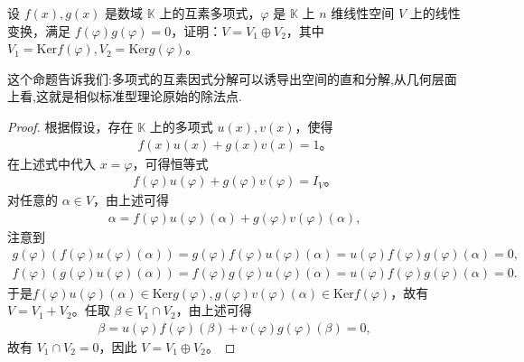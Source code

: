 \documentclass[lang=cn,newtx,10pt,scheme=chinese]{elegantbook}
\begin{document}
\begin{proposition}
设 $f(x), g(x)$ 是数域 $\mathbb{K}$ 上的互素多项式，$\varphi$ 是 $\mathbb{K}$ 上 $n$ 维线性空间 $V$ 上的线性变换，满足 $f(\varphi)g(\varphi) = 0$，证明：$V = V_1 \oplus V_2$，其中 $V_1 = \text{Ker} f(\varphi), V_2 = \text{Ker} g(\varphi)$。
\end{proposition}
\begin{note}
这个命题告诉我们:多项式的互素因式分解可以诱导出空间的直和分解,从几何层面上看,这就是相似标准型理论原始的除法点.
\end{note}
\begin{proof}
根据假设，存在 $\mathbb{K}$ 上的多项式 $u(x), v(x)$，使得
\begin{align*}
f(x)u(x) + g(x)v(x) = 1。
\end{align*}
在上述式中代入 $x = \varphi$，可得恒等式
\begin{align*}
f(\varphi)u(\varphi) + g(\varphi)v(\varphi) = I_V。
\end{align*}
对任意的 $\alpha \in V$，由上述可得
\begin{align*}
\alpha = f(\varphi)u(\varphi)(\alpha) + g(\varphi)v(\varphi)(\alpha),
\end{align*}
注意到 
\begin{align*}
g\left( \varphi \right) \left( f\left( \varphi \right) u\left( \varphi \right) \left( \alpha \right) \right) =g\left( \varphi \right) f\left( \varphi \right) u\left( \varphi \right) \left( \alpha \right) =u\left( \varphi \right) f\left( \varphi \right) g\left( \varphi \right) \left( \alpha \right) =0,
\\
f\left( \varphi \right) \left( g\left( \varphi \right) u\left( \varphi \right) \left( \alpha \right) \right) =f\left( \varphi \right) g\left( \varphi \right) u\left( \varphi \right) \left( \alpha \right) =u\left( \varphi \right) f\left( \varphi \right) g\left( \varphi \right) \left( \alpha \right) =0.
\end{align*}
于是$f(\varphi)u(\varphi)(\alpha) \in \text{Ker} g(\varphi), g(\varphi)v(\varphi)(\alpha) \in \text{Ker} f(\varphi)$，故有 $V = V_1 + V_2$。任取 $\beta \in V_1 \cap V_2$，由上述可得
\begin{align*}
\beta = u(\varphi)f(\varphi)(\beta) + v(\varphi)g(\varphi)(\beta) = 0,
\end{align*}
故有 $V_1 \cap V_2 = 0$，因此 $V = V_1 \oplus V_2$。     
\end{proof}
\end{document}
